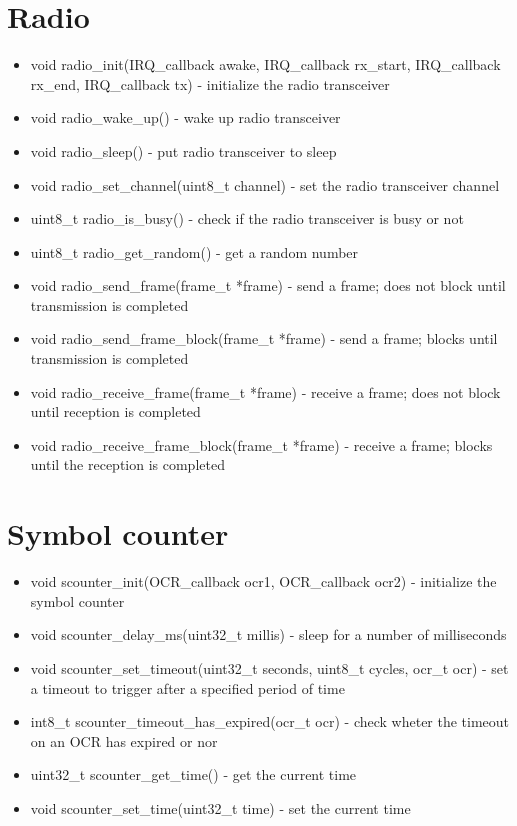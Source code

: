 \section{Radio}
\begin{itemize}
	\item void radio\_init(IRQ\_callback awake, IRQ\_callback rx\_start,
		IRQ\_callback rx\_end, IRQ\_callback tx) - initialize the radio
		transceiver
	\item void radio\_wake\_up() - wake up radio transceiver
	\item void radio\_sleep() - put radio transceiver to sleep
	\item void radio\_set\_channel(uint8\_t channel) - set the radio
		transceiver channel
	\item uint8\_t radio\_is\_busy() - check if the radio transceiver is
		busy or not
	\item uint8\_t radio\_get\_random() - get a random number
	\item void radio\_send\_frame(frame\_t *frame) - send a frame; does not
		block until transmission is completed
	\item void radio\_send\_frame\_block(frame\_t *frame) - send a frame;
		blocks until transmission is completed
	\item void radio\_receive\_frame(frame\_t *frame) - receive a frame;
		does not block until reception is completed
	\item void radio\_receive\_frame\_block(frame\_t *frame) - receive a
		frame; blocks until the reception is completed
\end{itemize}

\section{Symbol counter}
\begin{itemize}
	\item void scounter\_init(OCR\_callback ocr1, OCR\_callback ocr2) -
		initialize the symbol counter
	\item void scounter\_delay\_ms(uint32\_t millis) - sleep for a number
		of milliseconds
	\item void scounter\_set\_timeout(uint32\_t seconds, uint8\_t cycles,
		ocr\_t ocr) - set a timeout to trigger after a specified period
		of time
	\item int8\_t scounter\_timeout\_has\_expired(ocr\_t ocr) - check
		wheter the timeout on an OCR has expired or nor
	\item uint32\_t scounter\_get\_time() - get the current time
	\item void scounter\_set\_time(uint32\_t time) - set the current time
\end{itemize}

